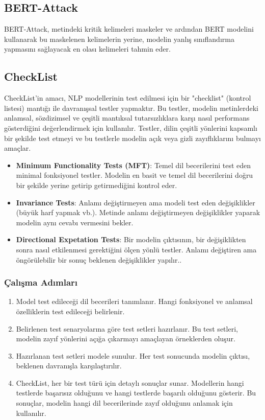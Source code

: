 \newpage

\subsection{BERT-Attack}

BERT-Attack, metindeki kritik kelimeleri maskeler ve ardından BERT modelini kullanarak bu maskelenen kelimelerin yerine, modelin yanlış sınıflandırma yapmasını sağlayacak en olası kelimeleri tahmin eder.

\newpage

\subsection{CheckList}

CheckList'in amacı, NLP modellerinin test edilmesi için bir "checklist" (kontrol listesi) mantığı ile davranışsal testler yapmaktır. Bu testler, modelin metinlerdeki anlamsal, sözdizimsel ve çeşitli mantıksal tutarsızlıklara karşı nasıl performans gösterdiğini değerlendirmek için kullanılır. Testler, dilin çeşitli yönlerini kapsamlı bir şekilde test etmeyi ve bu testlerle modelin açık veya gizli zayıflıklarını bulmayı amaçlar.

\begin{itemize}
    \item \textbf{Minimum Functionality Tests (MFT)}: Temel dil becerilerini test eden minimal fonksiyonel testler. Modelin en basit ve temel dil becerilerini doğru bir şekilde yerine getirip getirmediğini kontrol eder. 
    \item \textbf{Invariance Tests}: Anlamı değiştirmeyen ama modeli test eden değişiklikler (büyük harf yapmak vb.). Metinde anlamı değiştirmeyen değişiklikler yaparak modelin aynı cevabı vermesini bekler.
    \item \textbf{Directional Expetation Tests}: Bir modelin çıktısının, bir değişiklikten sonra nasıl etkilenmesi gerektiğini ölçen yönlü testler. Anlamı değiştiren ama öngörülebilir bir sonuç beklenen değişiklikler yapılır..
\end{itemize}

\subsubsection{Çalışma Adımları}

\begin{enumerate}
    \item Model test edileceği dil becerileri tanımlanır. Hangi fonksiyonel ve anlamsal özelliklerin test edileceği belirlenir.
    \item Belirlenen test senaryolarına göre test setleri hazırlanır. Bu test setleri, modelin zayıf yönlerini açığa çıkarmayı amaçlayan örneklerden oluşur. 
    \item Hazırlanan test setleri modele sunulur. Her test sonucunda modelin çıktısı, beklenen davranışla karşılaştırılır.
    \item CheckList, her bir test türü için detaylı sonuçlar sunar. Modellerin hangi testlerde başarısız olduğunu ve hangi testlerde başarılı olduğunu gösterir. Bu sonuçlar, modelin hangi dil becerilerinde zayıf olduğunu anlamak için kullanılır.
\end{enumerate}

